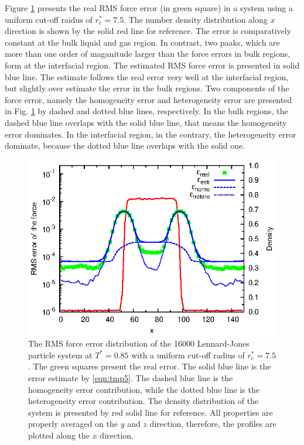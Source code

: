 \documentclass[aps,pre,preprint]{revtex4}
\begin{document}
Figure \ref{fig:tmp2} presents the real RMS force error (in green
square) in a system using a uniform cut-off raidus of $r_c^\ast =
7.5$. The number density distribution along $x$ direction is shown by
the solid red line for reference.  The error is comparatively constant
at the bulk liquid and gas region. In contrast, two paaks, which are
more than one order of maganitude larger than the force errors in bulk
regions, form at the interfacial region.  The estimated RMS force
error is presented in solid blue line.  The estimate follows the real
error very well at the interfacial region, but slightly over estimate
the error in the bulk regions.  Two components of the force error,
namely the homogeneity error and heterogeneity error are presented in
Fig. \ref{fig:tmp2} by dashed and dotted blue lines, respectively.  In
the bulk regions, the dashed blue line overlaps with the solid blue
line, that means the homogeneity error dominates.  In the interfacial
region, in the contrary, the heterogeneity error dominate, because the
dotted blue line overlaps with the solid one.

\begin{figure}
  \centering
  \includegraphics[]{fig/t0.85-n16000-rc07.5uni/error.uniform.eps}
  \caption{The RMS force error distribution of the 16000 Lennard-Jones
    particle system at $T^\ast=0.85$ with a uniform cut-off radius of
    $r_c^\ast = 7.5$. The green squares present the real error. The
    solid blue line is the error estimate by \eqref{eqn:tmp5}. The
    dashed blue line is the homogeneity error contribution, while the
    dotted blue line is the heterogeneity error contribution. The
    density distribution of the system is presented by red solid line
    for reference.  All properties are properly averaged on the $y$
    and $z$ direction, therefore, the profiles are plotted along the
    $x$ direction.  }
  \label{fig:tmp2}
\end{figure}
\end{document}
